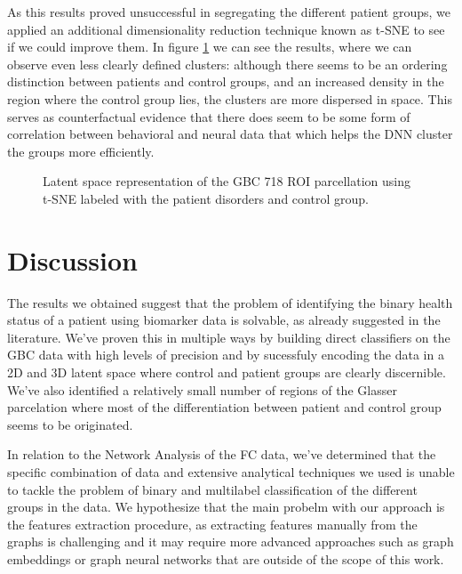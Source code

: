 \documentclass[fleqn,moreauthors,10pt]{ds_report}
\begin{document}
As this results proved unsuccessful in segregating the different patient groups, we applied an additional dimensionality reduction technique known as t-SNE to see if we could improve them. In figure \ref{fig:tsne} we can see the results, where we can observe even less clearly defined clusters: although there seems to be an ordering distinction between patients and control groups, and an increased density in the region where the control group lies, the clusters are more dispersed in space. This serves as counterfactual evidence that there does seem to be some form of correlation between behavioral and neural data that which helps the DNN cluster the groups more efficiently.

\begin{figure}[h!]
    \centering
    \caption{Latent space representation of the GBC 718 ROI parcellation using t-SNE labeled with the patient disorders and control group.}
    \label{fig:tsne}
\end{figure}


\section*{Discussion}
The results we obtained suggest that the problem of identifying the binary health status of a patient using biomarker data is solvable, as already suggested in the literature. We've proven this in multiple ways by building direct classifiers on the GBC data with high levels of precision and by sucessfuly encoding the data in a 2D and 3D latent space where control and patient groups are clearly discernible. We've also identified a relatively small number of regions of the Glasser parcelation where most of the differentiation between patient and control group seems to be originated. 

In relation to the Network Analysis of the FC data, we've determined that the specific combination of data and extensive analytical techniques we used is unable to tackle the problem of binary and multilabel classification of the different groups in the data. We hypothesize that the main probelm with our approach is the features extraction procedure, as extracting features manually from the graphs is challenging and it may require more advanced approaches such as graph embeddings or graph neural networks that are outside of the scope of this work.
\end{document}
